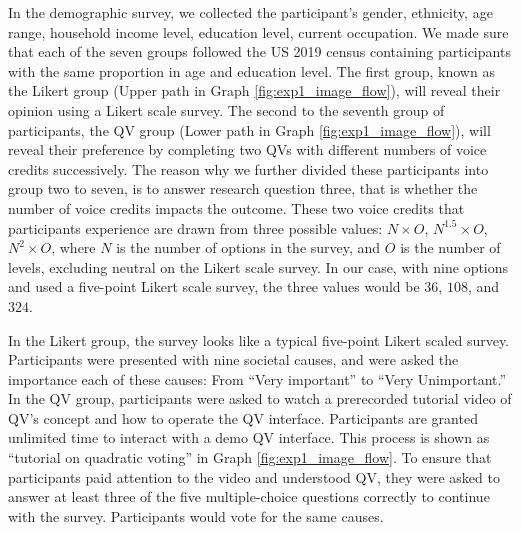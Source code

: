 In the demographic survey, we collected the participant's gender, ethnicity, age range, household income level, education level, current occupation.
We made sure that each of the seven groups followed the US 2019 census containing participants with the same proportion in age and education level.
The first group, known as the Likert group (Upper path in Graph \ref{fig:exp1_image_flow}), will reveal their opinion using a Likert scale survey.
The second to the seventh group of participants, the QV group (Lower path in Graph \ref{fig:exp1_image_flow}), will reveal their preference by completing two QVs with different numbers of voice credits successively.
The reason why we further divided these participants into group two to seven, is to answer research question three, that is whether the number of voice credits impacts the outcome.
These two voice credits that participants experience are drawn from three possible values: $N \times O$, $N^1.5 \times O$, $N^2 \times O$, where $N$ is the number of options in the survey, and $O$ is the number of levels, excluding neutral on the Likert scale survey. %
In our case, with nine options and used a five-point Likert scale survey, the three values would be $36$, $108$, and $324$.


In the Likert group, the survey looks like a typical five-point Likert scaled survey.
Participants were presented with nine societal causes, and were asked the importance each of these causes: From ``Very important'' to ``Very Unimportant.''
In the QV group, participants were asked to watch a prerecorded tutorial video of QV's concept and how to operate the QV interface.
Participants are granted unlimited time to interact with a demo QV interface. 
This process is shown as ``tutorial on quadratic voting'' in Graph \ref{fig:exp1_image_flow}.
To ensure that participants paid attention to the video and understood QV, they were asked to answer at least three of the five multiple-choice questions correctly to continue with the survey.
Participants would vote for the same causes.

